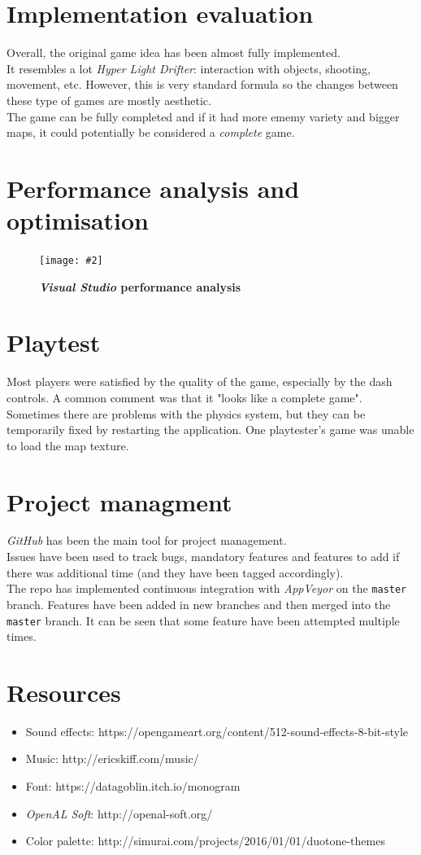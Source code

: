 \documentclass[10pt, a4paper]{article}
\newcommand{\figuremacro}[5]{
    \begin{figure}[#1]
        \centering
        \texttt{[image: \#2]}
        \caption[#3]{\textbf{#3}#4}
        \label{fig:#2}
    \end{figure}
}
\begin{document}
    
    \section{Implementation evaluation}
    Overall, the original game idea has been almost fully implemented.\\
    It resembles a lot \textit{Hyper Light Drifter}: interaction with objects, shooting, movement, etc. However, this is very standard formula so the changes between these type of games are mostly aesthetic.\\
    The game can be fully completed and if it had more ememy variety and bigger maps, it could potentially be considered a \textit{complete} game.
    
    \section{Performance analysis and optimisation}
    \figuremacro{h}{performance}{\textit{Visual Studio} performance analysis}{}{1.0}
    
    \section{Playtest}
    Most players were satisfied by the quality of the game, especially by the dash controls. A common comment was that it "looks like a complete game".
    Sometimes there are problems with the physics system, but they can be temporarily fixed by restarting the application.
    One playtester’s game was unable to load the map texture.
    
    \section{Project managment}
    \textit{GitHub} has been the main tool for project management.\\
    Issues have been used to track bugs, mandatory features and features to add if there was additional time (and they have been tagged accordingly).\\
    The repo has implemented continuous integration with \textit{AppVeyor} on the \texttt{master} branch.
    Features have been added in new branches and then merged into the \texttt{master} branch. It can be seen that some feature have been attempted multiple times.
    
    \section{Resources}
    \begin{itemize}
    	\item Sound effects: https://opengameart.org/content/512-sound-effects-8-bit-style
    	\item Music: http://ericskiff.com/music/
    	\item Font: https://datagoblin.itch.io/monogram
    	\item \textit{OpenAL Soft}: http://openal-soft.org/
    	\item Color palette: http://simurai.com/projects/2016/01/01/duotone-themes
    \end{itemize}
    
    


		
\end{document}
